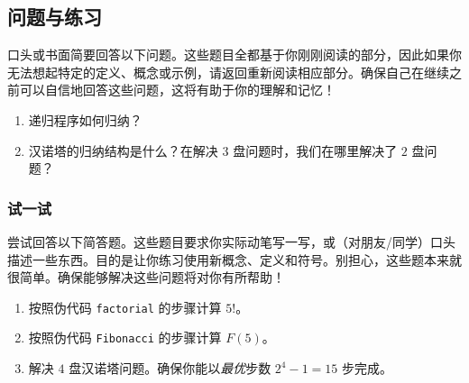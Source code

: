 \subsection{问题与练习}

口头或书面简要回答以下问题。这些题目全都基于你刚刚阅读的部分，因此如果你无法想起特定的定义、概念或示例，请返回重新阅读相应部分。确保自己在继续之前可以自信地回答这些问题，这将有助于你的理解和记忆！

\begin{enumerate}[label=(\arabic*)]
    \item 递归程序如何归纳？
    \item 汉诺塔的归纳结构是什么？在解决 $3$ 盘问题时，我们在哪里解决了 $2$ 盘问题？
\end{enumerate}

\subsubsection*{试一试}

尝试回答以下简答题。这些题目要求你实际动笔写一写，或（对朋友/同学）口头描述一些东西。目的是让你练习使用新概念、定义和符号。别担心，这些题本来就很简单。确保能够解决这些问题将对你有所帮助！

\begin{enumerate}[label=(\arabic*)]
    \item 按照伪代码 \verb|factorial| 的步骤计算 $5!$。
    \item 按照伪代码 \verb|Fibonacci| 的步骤计算 $F(5)$。
    \item 解决 $4$ 盘汉诺塔问题。确保你能以\textit{最优}步数 $2^4 - 1 = 15$ 步完成。
\end{enumerate}